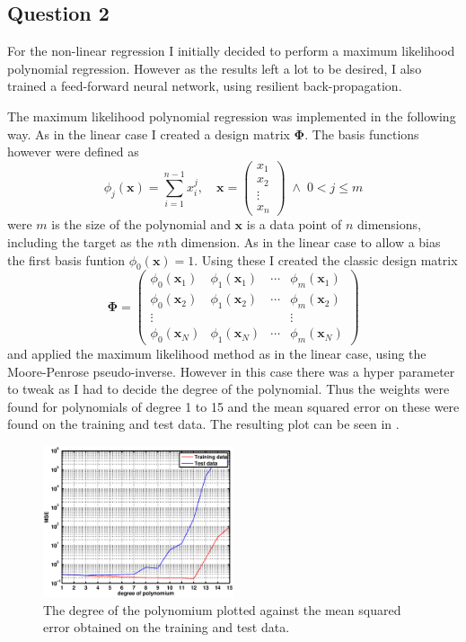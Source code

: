 \documentclass[a4paper, 11pt]{article}
\begin{document}
\subsection*{Question 2}
For the non-linear regression I initially decided to perform a maximum likelihood polynomial regression. However as the results left a lot to be desired, I also trained a feed-forward neural network, using resilient back-propagation.

The maximum likelihood polynomial regression was implemented in the following way. As in the linear case I created a design matrix $\bm\Phi$. The basis functions however were defined as
\[
    \phi_j(\mathbf{x}) = \sum_{i=1}^{n-1} x_i^j, \quad
    \mathbf{x} = \begin{pmatrix}
        x_1 \\ x_2 \\ \vdots \\ x_n
    \end{pmatrix} \; \wedge \; 0 < j \le m
\]
were $m$ is the size of the polynomial and $\mathbf{x}$ is a data point of $n$ dimensions, including the target as the $n$th dimension. As in the linear case to allow a bias the first basis funtion $\phi_0(\mathbf{x}) = 1$. Using these I created the classic design matrix
\[
    \bm\Phi = \begin{pmatrix}
        \phi_0(\mathbf{x}_1) & \phi_1(\mathbf{x}_1) & \cdots & \phi_m(\mathbf{x}_1) \\
        \phi_0(\mathbf{x}_2) & \phi_1(\mathbf{x}_2) & \cdots & \phi_m(\mathbf{x}_2) \\
        \vdots & & & \vdots \\
        \phi_0(\mathbf{x}_N) & \phi_1(\mathbf{x}_N) & \cdots & \phi_m(\mathbf{x}_N)
    \end{pmatrix}
\]
and applied the maximum likelihood method as in the linear case, using the Moore-Penrose pseudo-inverse. However in this case there was a hyper parameter to tweak as I had to decide the degree of the polynomial. Thus the weights were found for polynomials of degree 1 to 15 and the mean squared error on these were found on the training and test data. The resulting plot can be seen in .

\begin{figure}[H]
    \centering
    \includegraphics[width=0.5\textwidth]{figures/question2_1}
    \caption{The degree of the polynomium plotted against the mean squared error obtained on the training and test data.}\label{fig:question2_1}
\end{figure}
\end{document}
